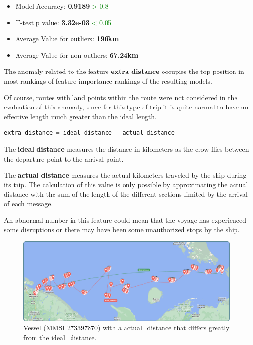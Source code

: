 \begin{itemize}
\item Model Accuracy: \textbf{0.9189} \textcolor{green}{> 0.8}
\item T-test p value: \textbf{3.32e-03} \textcolor{green}{< 0.05}
\item Average Value for outliers: \textbf{196km}
\item Average Value for non outliers: \textbf{67.24km}
\end{itemize}

The anomaly related to the feature \textbf{extra distance} occupies the top position in most rankings of feature importance rankings of the resulting models.

Of course, routes with land points within the route were not considered in the evaluation of this anomaly, since for this type of trip it is quite normal to have an effective length much greater than the ideal length.

\begin{lstlisting}[language=Python]
extra_distance = ideal_distance - actual_distance
\end{lstlisting}

The \textbf{ideal distance} measures the distance in kilometers as the crow flies between the departure point to the arrival point. 
    
The \textbf{actual distance} measures the actual kilometers traveled by the ship during its trip. The calculation of this value is only possible by approximating the actual distance with the sum of the length of the different sections limited by the arrival of each message.

An abnormal number in this feature could mean that the voyage has experienced some disruptions or there may have been some unauthorized stops by the ship.

\begin{figure}[H]
    \centering
    \includegraphics[width=16.5cm]{Images/3/anomaly-1.png}
    \caption{Vessel (MMSI 273397870) with a actual\_distance that differs greatly from the ideal\_distance.}
\end{figure}

